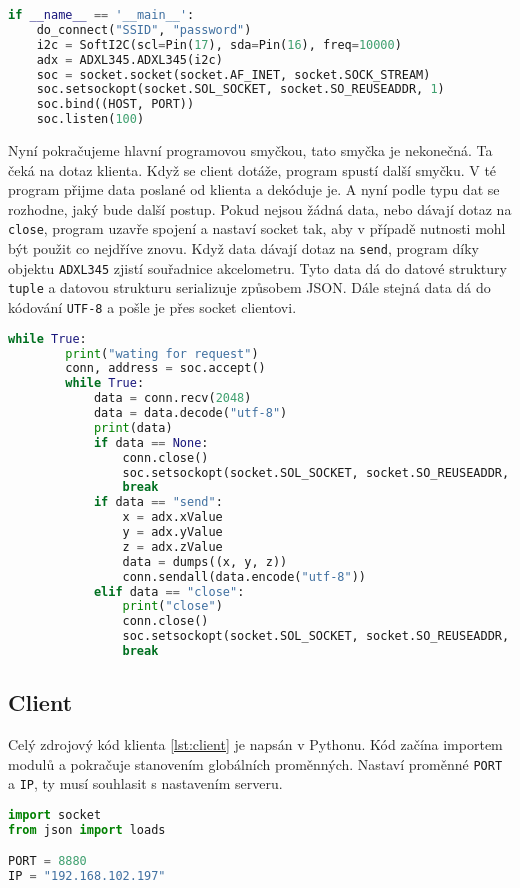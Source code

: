 \documentclass[12pt]{report}			%
\begin{document}
\begin{lstlisting}[title={Program server.py}, caption={server.py}, language=Python]
if __name__ == '__main__':
    do_connect("SSID", "password")
    i2c = SoftI2C(scl=Pin(17), sda=Pin(16), freq=10000)
    adx = ADXL345.ADXL345(i2c)
    soc = socket.socket(socket.AF_INET, socket.SOCK_STREAM)
    soc.setsockopt(socket.SOL_SOCKET, socket.SO_REUSEADDR, 1)
    soc.bind((HOST, PORT))
    soc.listen(100)
\end{lstlisting}

Nyní pokračujeme hlavní programovou smyčkou, tato smyčka je nekonečná. Ta čeká na dotaz klienta. Když se client dotáže, program spustí další smyčku. V té program přijme data poslané od klienta a dekóduje je. A nyní podle typu dat se rozhodne, jaký bude další postup. Pokud nejsou žádná data, nebo dávají dotaz na \texttt{close}, program uzavře spojení a nastaví socket tak, aby v případě nutnosti mohl být použit co nejdříve znovu. Když data dávají dotaz na \texttt{send}, program díky objektu \texttt{ADXL345} zjistí souřadnice akcelometru. Tyto data dá do datové struktury \texttt{tuple} a datovou strukturu serializuje způsobem JSON. Dále stejná data dá do kódování \texttt{UTF-8} a pošle je přes socket clientovi. 

\begin{lstlisting}[title={Program server.py}, caption={server.py}, language=Python]
  while True:
        print("wating for request")
        conn, address = soc.accept()
        while True:
            data = conn.recv(2048)
            data = data.decode("utf-8")
            print(data)
            if data == None:
                conn.close()
                soc.setsockopt(socket.SOL_SOCKET, socket.SO_REUSEADDR, 1)
                break
            if data == "send":
                x = adx.xValue
                y = adx.yValue
                z = adx.zValue
                data = dumps((x, y, z))
                conn.sendall(data.encode("utf-8"))
            elif data == "close":
                print("close")
                conn.close()
                soc.setsockopt(socket.SOL_SOCKET, socket.SO_REUSEADDR, 1)
                break
\end{lstlisting}

\subsection{Client}

Celý zdrojový kód klienta \ref{lst:client} je napsán v Pythonu. Kód začína importem modulů a pokračuje stanovením globálních proměnných. Nastaví proměnné \texttt{PORT} a \texttt{IP}, ty musí souhlasit s nastavením serveru. 
\begin{lstlisting}[title={Program client.py}, caption={client.py}, language=Python]
import socket
from json import loads

PORT = 8880
IP = "192.168.102.197"
\end{lstlisting}
\end{document}
